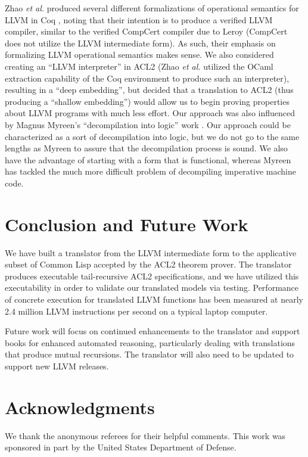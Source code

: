 \documentclass{eptcs}
\begin{document}
Zhao \emph{et al.} \cite{Vellvm} produced several different
formalizations of operational semantics for LLVM in Coq
\cite{CoqRefMan}, noting that their intention is to produce a verified
LLVM compiler, similar to the verified CompCert compiler due to Leroy
\cite{Leroy2009} (CompCert does not utilize the LLVM intermediate
form).  As such, their emphasis on formalizing LLVM operational
semantics makes sense.  We also considered creating an ``LLVM
interpreter'' in ACL2 (Zhao \emph{et al.} utilized the OCaml
extraction capability of the Coq environment to produce such an
interpreter), resulting in a ``deep embedding'', but decided that a
translation to ACL2 (thus producing a ``shallow embedding'') would allow
us to begin proving properties about LLVM programs with much less
effort.  Our approach was also influenced by Magnus Myreen's
``decompilation into logic'' work \cite{decomp}.  Our approach could
be characterized as a sort of decompilation into logic, but we do not
go to the same lengths as Myreen to assure that the decompilation
process is sound.  We also have the advantage of starting with a form
that is functional, whereas Myreen has tackled the much more difficult
problem of decompiling imperative machine code.

\section{Conclusion and Future Work}

We have built a translator from the LLVM intermediate form to the
applicative subset of Common Lisp accepted by the ACL2 theorem prover.
The translator produces executable tail-recursive ACL2 specifications,
and we have utilized this executability in order to validate our
translated models via testing.  Performance of concrete execution for
translated LLVM functions has been measured at nearly 2.4 million LLVM
instructions per second on a typical laptop computer.

Future work will focus on continued enhancements to the translator and
support books for enhanced automated reasoning, particularly dealing
with translations that produce mutual recursions.  The translator will
also need to be updated to support new LLVM releases.

\section{Acknowledgments}

We thank the anonymous referees for their helpful comments.
This work was sponsored in part by the United States Department of Defense.



\end{document}
